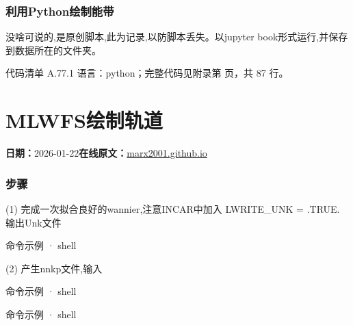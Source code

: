 \documentclass[lang=cn,scheme=chinese,color=blue,device=normal,toc=onecol,math=cm]{elegantbook}
\begin{document}
\subsubsection{利用Python绘制能带}


没啥可说的,是原创脚本,此为记录,以防脚本丢失。以jupyter book形式运行,并保存到数据所在的文件夹。\par


\begin{codeindexbox}{代码清单 A.77.1}
语言：python；完整代码见附录第 \pageref{code:77:1} 页，共 87 行。
\end{codeindexbox}



\section{MLWFS绘制轨道}
\begin{articlemeta}
\textbf{日期：}2026-01-22\hfill\textbf{在线原文：}\href{https://marx2001.github.io/sci-note\_posts/20260122-mlwfs}{marx2001.github.io}
\end{articlemeta}

\subsubsection{步骤}


(1) 完成一次拟合良好的wannier,注意INCAR中加入 LWRITE\_\allowbreak{}UNK = .TRUE. 输出Unk文件\par


\begin{inlinecodebox}{命令示例 · shell}
\end{inlinecodebox}


(2) 产生nnkp文件,输入\par


\begin{inlinecodebox}{命令示例 · shell}
\end{inlinecodebox}


\begin{inlinecodebox}{命令示例 · shell}
\end{inlinecodebox}
\end{document}
